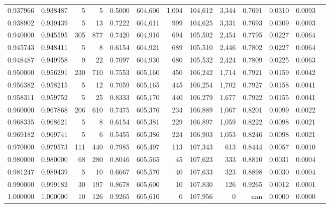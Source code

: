 \begin{tabular}{rrrrrrrrrrrrr}
0.937966 & 0.938487 &      5 &     5 &                                     0.5000 & 604,606 &   1,004 & 104,612 &   3,344 & 0.7691 & 0.0310 & 0.0093 \\
0.938902 & 0.939439 &      5 &    13 &                                     0.7222 & 604,611 &     999 & 104,625 &   3,331 & 0.7693 & 0.0309 & 0.0093 \\
0.940000 & 0.945595 &    305 &   877 &                                     0.7420 & 604,916 &     694 & 105,502 &   2,454 & 0.7795 & 0.0227 & 0.0064 \\
0.945743 & 0.948411 &      5 &     8 &                                     0.6154 & 604,921 &     689 & 105,510 &   2,446 & 0.7802 & 0.0227 & 0.0064 \\
0.948487 & 0.949958 &      9 &    22 &                                     0.7097 & 604,930 &     680 & 105,532 &   2,424 & 0.7809 & 0.0225 & 0.0063 \\
0.950000 & 0.956291 &    230 &   710 &                                     0.7553 & 605,160 &     450 & 106,242 &   1,714 & 0.7921 & 0.0159 & 0.0042 \\
0.956382 & 0.958215 &      5 &    12 &                                     0.7059 & 605,165 &     445 & 106,254 &   1,702 & 0.7927 & 0.0158 & 0.0041 \\
0.958311 & 0.959752 &      5 &    25 &                                     0.8333 & 605,170 &     440 & 106,279 &   1,677 & 0.7922 & 0.0155 & 0.0041 \\
0.960000 & 0.967868 &    206 &   610 &                                     0.7475 & 605,376 &     234 & 106,889 &   1,067 & 0.8201 & 0.0099 & 0.0022 \\
0.968335 & 0.968621 &      5 &     8 &                                     0.6154 & 605,381 &     229 & 106,897 &   1,059 & 0.8222 & 0.0098 & 0.0021 \\
0.969182 & 0.969741 &      5 &     6 &                                     0.5455 & 605,386 &     224 & 106,903 &   1,053 & 0.8246 & 0.0098 & 0.0021 \\
0.970000 & 0.979573 &    111 &   440 &                                     0.7985 & 605,497 &     113 & 107,343 &     613 & 0.8444 & 0.0057 & 0.0010 \\
0.980000 & 0.980000 &     68 &   280 &                                     0.8046 & 605,565 &      45 & 107,623 &     333 & 0.8810 & 0.0031 & 0.0004 \\
0.981247 & 0.989439 &      5 &    10 &                                     0.6667 & 605,570 &      40 & 107,633 &     323 & 0.8898 & 0.0030 & 0.0004 \\
0.990000 & 0.999182 &     30 &   197 &                                     0.8678 & 605,600 &      10 & 107,830 &     126 & 0.9265 & 0.0012 & 0.0001 \\
1.000000 & 1.000000 &     10 &   126 &                                     0.9265 & 605,610 &       0 & 107,956 &       0 &    nan & 0.0000 & 0.0000 \\
\bottomrule
\end{tabular}
